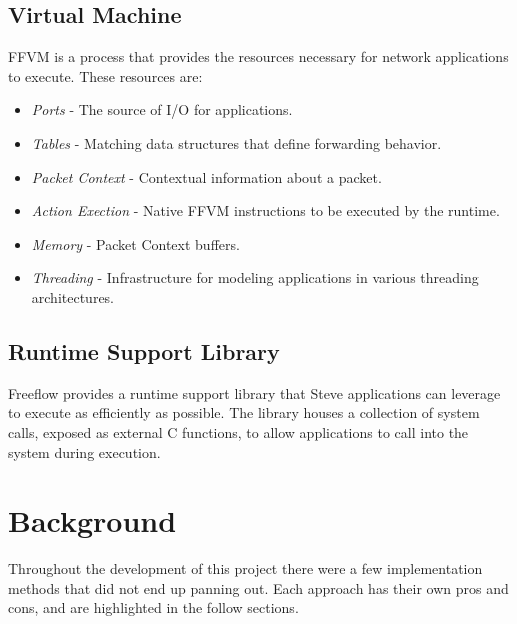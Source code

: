 \subsection{Virtual Machine}
FFVM is a process that provides the resources necessary for network
applications to execute. These resources are:

\begin{itemize}
\item \emph{Ports} - The source of I/O for applications.
\item \emph{Tables} - Matching data structures that define forwarding behavior.
\item \emph{Packet Context} - Contextual information about a packet.
\item \emph{Action Exection} - Native FFVM instructions to be executed by the runtime.
\item \emph{Memory} - Packet Context buffers.
\item \emph{Threading} - Infrastructure for modeling applications in various threading architectures.
\end{itemize}

\subsection{Runtime Support Library}
Freeflow provides a runtime support library that Steve applications can leverage to execute as efficiently as possible. The library houses a collection
of system calls, exposed as external C functions, to allow applications to call
into the system during execution.

\section{Background}
Throughout the development of this project there were a few implementation
methods that did not end up panning out. Each approach has their own pros
and cons, and are highlighted in the follow sections.

